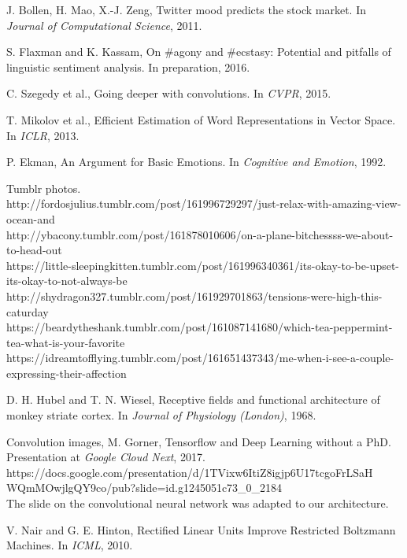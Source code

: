 \begin{thebibliography}{999}

J. Bollen, H. Mao, X.-J. Zeng, Twitter mood predicts the stock market. In \textit{Journal of Computational Science}, 2011.

S. Flaxman and K. Kassam, On \#agony and \#ecstasy: Potential and pitfalls of linguistic sentiment analysis. In preparation, 2016.

C. Szegedy et al., Going deeper with convolutions. In \textit{CVPR}, 2015.

T. Mikolov et al., Efficient Estimation of Word Representations in Vector Space. In \textit{ICLR}, 2013.

P. Ekman, An Argument for Basic Emotions. In \textit{Cognitive and Emotion}, 1992.

Tumblr photos.\\
http://fordosjulius.tumblr.com/post/161996729297/just-relax-with-amazing-view-ocean-and\\
http://ybacony.tumblr.com/post/161878010606/on-a-plane-bitchessss-we-about-to-head-out\\
https://little-sleepingkitten.tumblr.com/post/161996340361/its-okay-to-be-upset-its-okay-to-not-always-be\\
http://shydragon327.tumblr.com/post/161929701863/tensions-were-high-this-caturday\\
https://beardytheshank.tumblr.com/post/161087141680/which-tea-peppermint-tea-what-is-your-favorite\\
https://idreamtofflying.tumblr.com/post/161651437343/me-when-i-see-a-couple-expressing-their-affection

D. H. Hubel and T. N. Wiesel, Receptive fields and functional architecture of monkey striate cortex. In \textit{Journal of Physiology (London)}, 1968.

Convolution images, M. Gorner, Tensorflow and Deep Learning without a PhD. Presentation at \textit{Google Cloud Next}, 2017.\\ 
https://docs.google.com/presentation/d/1TVixw6ItiZ8igjp6U17tcgoFrLSaH\\WQmMOwjlgQY9co/pub?slide=id.g1245051c73\_0\_2184\\
The slide on the convolutional neural network was adapted to our architecture.

V. Nair and G. E. Hinton, Rectified Linear Units Improve Restricted Boltzmann Machines. In \textit{ICML}, 2010.


\end{thebibliography}
